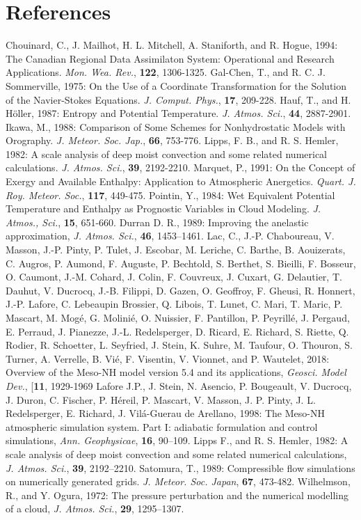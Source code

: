 \section{References}
\por
Chouinard, C., J. Mailhot, H. L. Mitchell, A. Staniforth, and R. Hogue, 1994:
The Canadian Regional Data Assimilaton System: Operational and Research
Applications. {\it Mon. Wea. Rev.}, {\bf 122}, 1306-1325.
\por
Gal-Chen, T., and R. C. J. Sommerville, 1975: On the Use of a Coordinate
Transformation for the Solution of the Navier-Stokes Equations. {\it J. Comput.
Phys.}, {\bf 17}, 209-228.
\por
Hauf, T., and H. H\"oller, 1987: Entropy and Potential Temperature. {\it J. Atmos.
Sci.}, {\bf 44}, 2887-2901.
\por
Ikawa, M., 1988: Comparison of Some Schemes for Nonhydrostatic Models with
Orography. {\it J. Meteor. Soc. Jap.}, {\bf 66}, 753-776.
\por
Lipps, F. B., and R. S. Hemler, 1982: A scale analysis of deep moist convection
and some related numerical calculations. {\it J. Atmos. Sci.}, {\bf 39}, 2192-2210.
\por
Marquet, P., 1991: On the Concept of Exergy and Available Enthalpy: Application
to Atmospheric Anergetics. {\it Quart. J. Roy. Meteor. Soc.}, {\bf 117}, 449-475.
\por
Pointin, Y., 1984: Wet Equivalent Potential Temperature and Enthalpy as
Prognostic Variables in Cloud Modeling. {\it J. Atmos., Sci.}, {\bf 15}, 651-660.
\por
Durran D. R., 1989: Improving the anelastic approximation, {\it J. Atmos. Sci.}, {\bf 46}, 1453--1461.
\por
Lac, C., J.-P. Chaboureau, V. Masson, J.-P. Pinty, P. Tulet, J. Escobar, M. Leriche, C. Barthe, B. Aouizerats, C. Augros, P. Aumond, F. Auguste, P. Bechtold, S. Berthet, S. Bieilli, F. Bosseur, O. Caumont, J.-M. Cohard, J. Colin, F. Couvreux, J. Cuxart, G. Delautier, T. Dauhut, V. Ducrocq, J.-B. Filippi, D. Gazen, O. Geoffroy, F. Gheusi, R. Honnert, J.-P. Lafore, C. Lebeaupin Brossier, Q. Libois, T. Lunet, C. Mari, T. Maric, P. Mascart, M. Mogé, G. Molinié, O. Nuissier, F. Pantillon, P. Peyrillé, J. Pergaud, E. Perraud, J. Pianezze, J.-L. Redelsperger, D. Ricard, E. Richard, S. Riette, Q. Rodier, R. Schoetter, L. Seyfried, J. Stein, K. Suhre, M. Taufour, O. Thouron, S. Turner, A. Verrelle, B. Vié, F. Visentin, V. Vionnet, and P. Wautelet, 2018: Overview of the Meso-NH model version 5.4 and its applications, {\it Geosci. Model Dev.}, [{\bf 11}, 1929-1969
\por
Lafore J.P., J. Stein, N. Asencio, P. Bougeault, V. Ducrocq, J. Duron, C. Fischer, P. H\'ereil,
P. Mascart, V. Masson, J. P. Pinty, J. L. Redelsperger, E. Richard, J. Vil\'a-Guerau de
Arellano, 1998: The Meso-NH atmospheric simulation system. Part I: adiabatic formulation and
control simulations, {\it Ann. Geophysicae}, {\bf 16}, 90--109.
\por
Lipps F., and R. S. Hemler, 1982: A scale analysis of deep moist convection and some related
numerical calculations, {\it J. Atmos. Sci.}, {\bf 39}, 2192--2210.
\por
Satomura, T., 1989: Compressible flow simulations on numerically generated grids. {\it J. Meteor. Soc. Japan}, {\bf 67}, 473-482. 
\por
Wilhelmson, R., and Y. Ogura, 1972: The pressure perturbation and the numerical modelling of a
cloud, {\it J. Atmos. Sci.}, {\bf 29}, 1295--1307.

